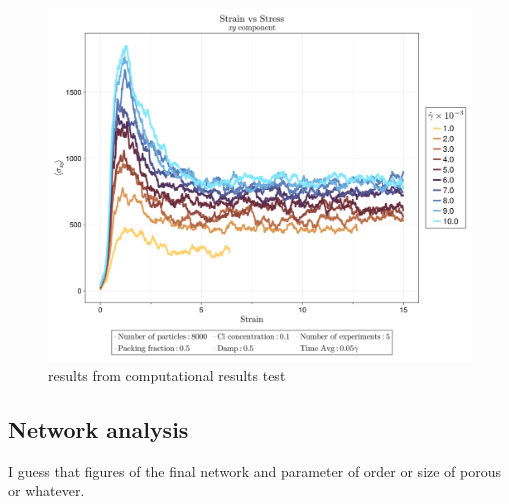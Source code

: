 \begin{figure}[ht!]
    \centering
    \includegraphics[width=\textwidth]{figs/ComputaitonalResults/strain-vs-stressxy.png}
    \caption{results from computational results test}
\end{figure}


\subsection{Network analysis}

I guess that figures of the final network and parameter of order or size of porous or whatever.

